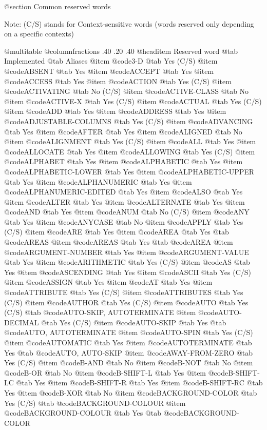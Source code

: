 @section Common reserved words

Note: (C/S) stands for Context-sensitive words (words reserved only
depending on a specific contexts)

@multitable @columnfractions .40 .20 .40
@headitem Reserved word @tab Implemented @tab Aliases
@item @code{3-D} @tab Yes (C/S)
@item @code{ABSENT} @tab Yes
@item @code{ACCEPT} @tab Yes
@item @code{ACCESS} @tab Yes
@item @code{ACTION} @tab Yes (C/S)
@item @code{ACTIVATING} @tab No (C/S)
@item @code{ACTIVE-CLASS} @tab No
@item @code{ACTIVE-X} @tab Yes (C/S)
@item @code{ACTUAL} @tab Yes (C/S)
@item @code{ADD} @tab Yes
@item @code{ADDRESS} @tab Yes
@item @code{ADJUSTABLE-COLUMNS} @tab Yes (C/S)
@item @code{ADVANCING} @tab Yes
@item @code{AFTER} @tab Yes
@item @code{ALIGNED} @tab No
@item @code{ALIGNMENT} @tab Yes (C/S)
@item @code{ALL} @tab Yes
@item @code{ALLOCATE} @tab Yes
@item @code{ALLOWING} @tab Yes (C/S)
@item @code{ALPHABET} @tab Yes
@item @code{ALPHABETIC} @tab Yes
@item @code{ALPHABETIC-LOWER} @tab Yes
@item @code{ALPHABETIC-UPPER} @tab Yes
@item @code{ALPHANUMERIC} @tab Yes
@item @code{ALPHANUMERIC-EDITED} @tab Yes
@item @code{ALSO} @tab Yes
@item @code{ALTER} @tab Yes
@item @code{ALTERNATE} @tab Yes
@item @code{AND} @tab Yes
@item @code{ANUM} @tab No (C/S)
@item @code{ANY} @tab Yes
@item @code{ANYCASE} @tab No
@item @code{APPLY} @tab Yes (C/S)
@item @code{ARE} @tab Yes
@item @code{AREA} @tab Yes @tab @code{AREAS}
@item @code{AREAS} @tab Yes @tab @code{AREA}
@item @code{ARGUMENT-NUMBER} @tab Yes
@item @code{ARGUMENT-VALUE} @tab Yes
@item @code{ARITHMETIC} @tab Yes (C/S)
@item @code{AS} @tab Yes
@item @code{ASCENDING} @tab Yes
@item @code{ASCII} @tab Yes (C/S)
@item @code{ASSIGN} @tab Yes
@item @code{AT} @tab Yes
@item @code{ATTRIBUTE} @tab Yes (C/S)
@item @code{ATTRIBUTES} @tab Yes (C/S)
@item @code{AUTHOR} @tab Yes (C/S)
@item @code{AUTO} @tab Yes (C/S) @tab @code{AUTO-SKIP, AUTOTERMINATE}
@item @code{AUTO-DECIMAL} @tab Yes (C/S)
@item @code{AUTO-SKIP} @tab Yes @tab @code{AUTO, AUTOTERMINATE}
@item @code{AUTO-SPIN} @tab Yes (C/S)
@item @code{AUTOMATIC} @tab Yes
@item @code{AUTOTERMINATE} @tab Yes @tab @code{AUTO, AUTO-SKIP}
@item @code{AWAY-FROM-ZERO} @tab Yes (C/S)
@item @code{B-AND} @tab No
@item @code{B-NOT} @tab No
@item @code{B-OR} @tab No
@item @code{B-SHIFT-L} @tab Yes
@item @code{B-SHIFT-LC} @tab Yes
@item @code{B-SHIFT-R} @tab Yes
@item @code{B-SHIFT-RC} @tab Yes
@item @code{B-XOR} @tab No
@item @code{BACKGROUND-COLOR} @tab Yes (C/S) @tab @code{BACKGROUND-COLOUR}
@item @code{BACKGROUND-COLOUR} @tab Yes @tab @code{BACKGROUND-COLOR}
